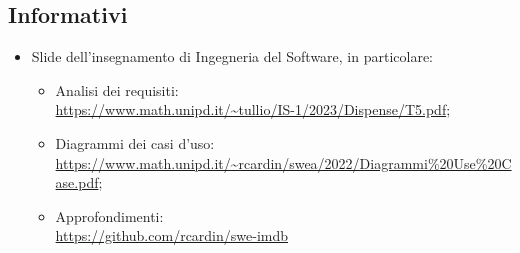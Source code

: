 \subsection{Informativi}
\begin{itemize}
    \item Slide dell’insegnamento di Ingegneria del Software, in particolare:
        \begin{itemize}
            \item Analisi dei requisiti: \\ \url{https://www.math.unipd.it/~tullio/IS-1/2023/Dispense/T5.pdf};
            \item Diagrammi dei casi d'uso:\\ \url{https://www.math.unipd.it/~rcardin/swea/2022/Diagrammi%20Use%20Case.pdf};
            \item Approfondimenti:\\ \url{https://github.com/rcardin/swe-imdb}
        \end{itemize}
\end{itemize}
